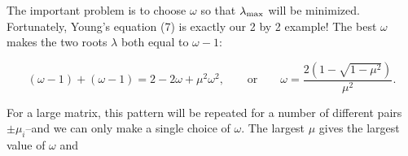 The important problem is to choose \(\omega\) so that \(\lambda_{\rm max}\) will be minimized. Fortunately, Young's equation (7) is exactly our 2 by 2 example! The best \(\omega\) makes the two roots \(\lambda\) both equal to \(\omega-1\):

\[(\omega-1)+(\omega-1)=2-2\omega+\mu^{2}\omega^{2},\qquad\mbox{or}\qquad\omega= \frac{2(1-\sqrt{1-\mu^{2}})}{\mu^{2}}.\]

For a large matrix, this pattern will be repeated for a number of different pairs \(\pm\mu_{i}\)--and we can only make a single choice of \(\omega\). The largest \(\mu\) gives the largest value of \(\omega\) and 